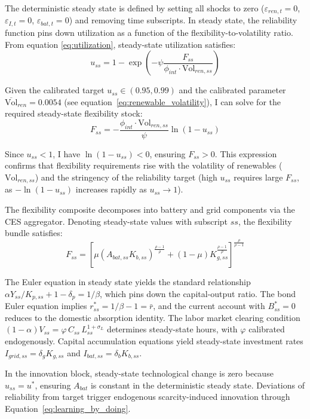 \documentclass[12pt, a4paper]{article}
\begin{document}
The deterministic steady state is defined by setting all shocks to zero ($\varepsilon_{ren,t} = 0$, $\varepsilon_{I,t} = 0$, $\varepsilon_{bat,t} = 0$) and removing time subscripts. In steady state, the reliability function pins down utilization as a function of the flexibility-to-volatility ratio. From equation \eqref{eq:utilization}, steady-state utilization satisfies:
\begin{equation}
u_{ss} = 1 - \exp\left(-\psi \frac{F_{ss}}{\phi_{int} \cdot \text{Vol}_{ren,ss}}\right)
\label{eq:uss}
\end{equation}

Given the calibrated target $u_{ss} \in (0.95, 0.99)$ and the calibrated parameter $\overline{\text{Vol}}_{ren} = 0.0054$ (see equation~\ref{eq:renewable_volatility}), I can solve for the required steady-state flexibility stock:
\begin{equation}
F_{ss} = -\frac{\phi_{int} \cdot \text{Vol}_{ren,ss}}{\psi} \ln(1 - u_{ss})
\end{equation}

Since $u_{ss} < 1$, I have $\ln(1-u_{ss}) < 0$, ensuring $F_{ss} > 0$. This expression confirms that flexibility requirements rise with the volatility of renewables ($\text{Vol}_{ren,ss}$) and the stringency of the reliability target (high $u_{ss}$ requires large $F_{ss}$, as $-\ln(1-u_{ss})$ increases rapidly as $u_{ss} \to 1$).

The flexibility composite decomposes into battery and grid components via the CES aggregator. Denoting steady-state values with subscript $ss$, the flexibility bundle satisfies:
\begin{equation}
F_{ss} =
\left[
\mu (A_{bat,ss} K_{b,ss})^{\frac{\rho-1}{\rho}}
+
(1-\mu) K_{g,ss}^{\frac{\rho-1}{\rho}}
\right]^{\frac{\rho}{\rho-1}}
\end{equation}

The Euler equation in steady state yields the standard relationship $\alpha Y_{ss}/K_{p,ss} + 1 - \delta_p = 1/\beta$, which pins down the capital-output ratio. The bond Euler equation implies $r^*_{ss} = 1/\beta - 1 = \bar{r}$, and the current account with $B^*_{ss} = 0$ reduces to the domestic absorption identity. The labor market clearing condition $(1-\alpha)V_{ss} = \varphi \, C_{ss} \, L_{ss}^{1+\sigma_L}$ determines steady-state hours, with $\varphi$ calibrated endogenously. Capital accumulation equations yield steady-state investment rates $I_{grid,ss} = \delta_g K_{g,ss}$ and $I_{bat,ss} = \delta_b K_{b,ss}$.

In the innovation block, steady-state technological change is zero because $u_{ss} = u^*$, ensuring $A_{bat}$ is constant in the deterministic steady state. Deviations of reliability from target trigger endogenous scarcity-induced innovation through Equation~\eqref{eq:learning_by_doing}.
\end{document}
